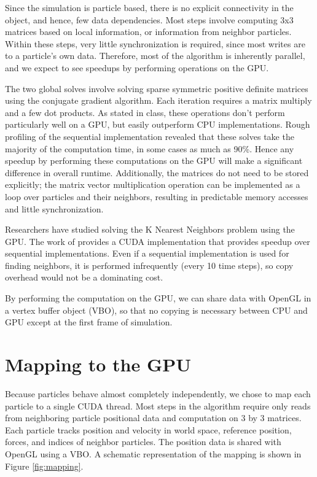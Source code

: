 \documentclass[cameraready]{acmsiggraph-awb}
\begin{document}
Since the simulation is particle based, there is no explicit connectivity in the object, and hence, few data dependencies.  
Most steps involve computing 3x3 matrices based on local information, or information from neighbor particles.  
Within these steps, very little synchronization is required, since most writes are to a particle's own data. 
Therefore, most of the algorithm is inherently parallel, and we expect to see speedups by performing operations on the GPU.  

The two global solves involve solving sparse symmetric positive definite matrices using the conjugate gradient algorithm.  Each iteration requires a matrix multiply and a few dot products.  As stated in class, these operations don't perform particularly well on a GPU, but easily outperform CPU implementations.  Rough profiling of the sequential implementation revealed that these solves take the majority of the computation time, in some cases as much as 90\%.   Hence any speedup by performing these computations on the GPU will make a significant difference in overall runtime.  Additionally, the matrices do not need to be stored explicitly; the matrix vector multiplication operation can be implemented as a loop over particles and their neighbors, resulting in predictable memory accesses and little synchronization.  

Researchers have studied solving the K Nearest Neighbors problem using the GPU.   The work of \cite{Garcia_2008_CVGPU} provides a CUDA implementation that provides speedup over sequential implementations.  Even if a sequential implementation is used for finding neighbors, it is performed infrequently (every 10 time steps), so copy overhead would not be a dominating cost.  

By performing the computation on the GPU, we can share data with OpenGL in a vertex buffer object (VBO), so that no copying is necessary between CPU and GPU except at the first frame of simulation.  


\section{Mapping to the GPU}

Because particles behave almost completely independently, we chose to map each particle to a single CUDA thread.  Most steps in the algorithm require only reads from neighboring particle positional data and computation on 3 by 3 matrices.  Each particle tracks position and velocity in world space, reference position, forces, and indices of neighbor particles.  The position data is shared with OpenGL using a VBO.  A schematic representation of the mapping is shown in Figure \ref{fig:mapping}.
\end{document}
